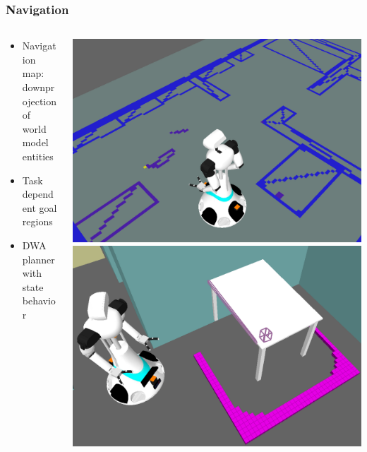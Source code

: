 \documentclass[t]{beamer}
\begin{document}
\begin{frame}
	\frametitle{Navigation}
	\begin{columns}
		\begin{column}{0.5\textwidth}
			\begin{itemize}
				\item<1-> Navigation map: downprojection of world model entities
				\item<2-> Task dependent goal regions
				\item<3-> DWA planner with state behavior
			\end{itemize}
		\end{column}		
		\begin{column}{0.5\textwidth}
			\begin{center}
				 {\includegraphics[width=1\linewidth]{Figures/lab_ed_map_crop}}
				\only<2-> {\includegraphics[width=0.75\linewidth]{Figures/constraint_table}
						  \\ \vspace{0.25cm}
}
\end{center}
\end{column}
\end{columns}
\end{frame}
\end{document}
